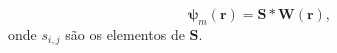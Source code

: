 \documentclass[
    12pt,                %
    oneside,            %
    a4paper,            %
    english,            %
    french,                %
    spanish,            %
    brazil                %
    ]{abntex2}
\begin{document}
\begin{equation}
\label{eq::gqi_vec}
    \boldsymbol{\psi}_m(\mathbf{r}) = \mathbf{S}*\mathbf{W}(\mathbf{r}) ,
\end{equation}
onde $s_{i,j}$ são os elementos de $\mathbf{S}$.







\end{document}
